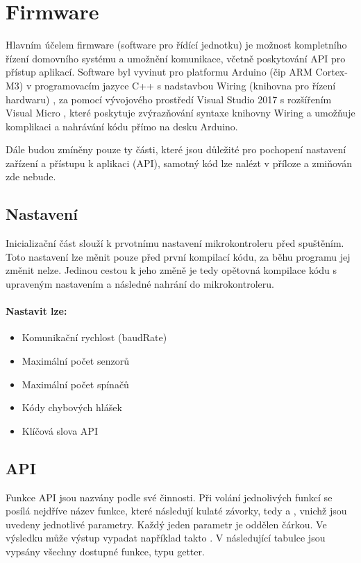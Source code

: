 \documentclass[FM,DP]{tulthesis}  %
\begin{document}
\section{Firmware}
Hlavním účelem firmware (software pro řídící jednotku) je možnost kompletního řízení domovního systému a umožnění komunikace, včetně poskytování API pro přístup aplikací. Software byl vyvinut pro platformu Arduino (čip ARM Cortex-M3) v programovacím jazyce C++ s nadstavbou Wiring (knihovna pro řízení hardwaru) \cite{Wiring}, za pomocí vývojového prostředí Visual Studio 2017 s rozšířením Visual Micro \cite{Visual Micro}, které poskytuje zvýrazňování syntaxe knihovny Wiring a umožňuje komplikaci a nahrávání kódu přímo na desku Arduino.

Dále budou zmíněny pouze ty části, které jsou důležité pro pochopení nastavení zařízení a přístupu k aplikaci (API), samotný kód lze nalézt v příloze a zmiňován zde nebude.

\subsection{Nastavení}
Inicializační část slouží k prvotnímu nastavení mikrokontroleru před spuštěním. Toto nastavení lze měnit pouze před první kompilací kódu, za běhu programu jej změnit nelze. Jedinou cestou k jeho změně je tedy opětovná kompilace kódu s upraveným nastavením a následné nahrání do mikrokontroleru.

\paragraph{Nastavit lze:}
\begin{itemize}
\item Komunikační rychlost (baudRate)
\item Maximální počet senzorů
\item Maximální počet spínačů
\item Kódy chybových hlášek
\item Klíčová slova API
\end{itemize} 

\subsection{API}
Funkce API jsou nazvány podle své činnosti. Při volání jednolivých funkcí se posílá nejdříve název funkce, které následují kulaté závorky, tedy \uv{(} a \uv{)}, vnichž jsou uvedeny jednotlivé parametry. Každý jeden parametr je oddělen čárkou. Ve výsledku může výstup vypadat například takto . V následující tabulce jsou vypsány všechny dostupné funkce, typu getter.
\end{document}
